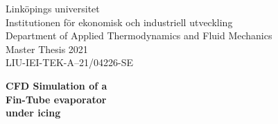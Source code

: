 \documentclass[11pt,a4paper,twoside,oneside]{article}
\begin{document}
\begin{titlepage}

    \hfill
    \begin{minipage}{15cm}
        \begin{onehalfspacing}
        \raggedleft
        Link\"opings universitet\\
        Institutionen f\"or ekonomisk och industriell utveckling\\
        Department of Applied Thermodynamics and Fluid Mechanics \\
        Master Thesis 2021\\%
        LIU-IEI-TEK-A--21/04226-SE\\
        \end{onehalfspacing}
    \end{minipage}
    
	\vspace{2cm}
	\noindent
	\hspace{3cm} 
	{\Huge\textbf{CFD Simulation of a\\
	\hspace*{3.1cm}Fin-Tube evaporator\\
	\hspace*{3.1cm}under icing}\par}
	
	
	\vspace{.5cm}
	\noindent
	\hspace{3cm}
	\hrulefill
	\hspace{2.7cm}
	
	\vspace{1.3cm}
	\noindent {}

	

\end{titlepage}
\end{document}
